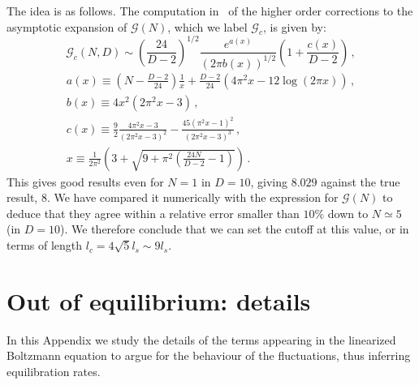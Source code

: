\documentclass[a4paper,11pt]{article}
\newcommand{\lr}[1]{\left(#1\right)}
\begin{document}
The idea is as follows.
The computation in~\cite{Manes:2001cs} of the higher order corrections to the asymptotic expansion of $\mathcal{G}(N)$, which we label $\mathcal{G}_c$, is given by:
\begin{equation}
    \mathcal{G}_c(N,D)\sim \lr{\frac{24}{D-2}}^{1/2}\frac{e^{a(x)}}{(2\pi b(x))^{1/2}}\lr{1+\frac{c(x)}{D-2}}\, , 
\end{equation}
\begin{gather*}
    a(x)\equiv \lr{N-\frac{D-2}{24}}\frac{1}{x}+\frac{D-2}{24}(4\pi^2x-12\log (2\pi x))\, ,\\
    b(x)\equiv 4x^2(2\pi^2x-3)\, , \\
    c(x)\equiv \frac{9}{2}\frac{4\pi^2x-3}{(2\pi^2x-3)^2}-\frac{45(\pi^2x-1)^2}{(2\pi^2x-3)^3}\, , \\
    x\equiv \frac{1}{2\pi^2}\lr{3+\sqrt{9+\pi^2 \lr{\frac{24N}{D-2}-1}}}\, .
\end{gather*}
This gives good results even for $N=1$ in $D=10$, giving $8.029$ against the true result, $8$.
We have compared it numerically with the expression for $\mathcal{G}(N)$ to deduce that they agree within a relative error smaller than $10\%$ down to $N\simeq 5$ (in $D=10$).
We therefore conclude that we can set the cutoff at this value, or in terms of length $l_c=4\sqrt{5}l_s\sim 9l_s$.
\section{Out of equilibrium: details}\label{sec:detail-perturbations}
In this Appendix we study the details of the terms appearing in the linearized Boltzmann equation to argue for the behaviour of the fluctuations, thus inferring equilibration rates.
\end{document}
